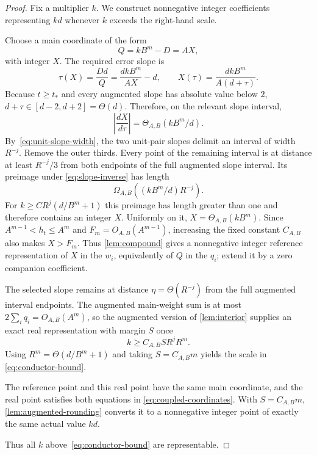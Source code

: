 \begin{proof}
  Fix a multiplier $k$.  We construct nonnegative integer coefficients
  representing $kd$ whenever $k$ exceeds the right-hand scale.

  Choose a main coordinate of the form
  \[
    Q=kB^m-D=AX,
  \]
  with integer $X$.  The required error slope is
  \begin{equation}
    \tau(X)=\frac{Dd}{Q}
           =\frac{dkB^m}{AX}-d,
    \qquad
    X(\tau)=\frac{dkB^m}{A(d+\tau)}.
    \label{eq:slope-inverse}
  \end{equation}
  Because $t\ge t_*$ and every augmented slope has absolute value below $2$,
  $d+\tau\in[d-2,d+2]=\Theta(d)$.  Therefore, on the relevant slope interval,
  \[
    \left|\frac{dX}{d\tau}\right|
    =\Theta_{A,B}(kB^m/d).
  \]
  By~\eqref{eq:unit-slope-width}, the two unit-pair slopes delimit an interval
  of width $R^{-j}$.  Remove the outer thirds.  Every point of the remaining
  interval is at distance at least $R^{-j}/3$ from both endpoints of the full
  augmented slope interval.  Its preimage under
  \eqref{eq:slope-inverse} has length
  \[
    \Omega_{A,B}\!\left((kB^m/d)R^{-j}\right).
  \]
  For $k\ge C R^j(d/B^m+1)$ this preimage has length greater than one and
  therefore contains an integer $X$.  Uniformly on it,
  $X=\Theta_{A,B}(kB^m)$.  Since $A^{m-1}<h_t\le A^m$ and
  $F_m=O_{A,B}(A^{m-1})$, increasing the fixed constant $C_{A,B}$ also makes
  $X>F_m$.  Thus \cref{lem:compound} gives a nonnegative integer reference
  representation of $X$ in the $w_i$, equivalently of $Q$ in the $q_i$;
  extend it by a zero companion coefficient.

  The selected slope remains at distance
  $\eta=\Theta(R^{-j})$ from the full augmented interval endpoints.  The
  augmented main-weight sum is at most $2\sum_iq_i=O_{A,B}(A^m)$, so the
  augmented version of \cref{lem:interior} supplies an exact real
  representation with margin $S$ once
  \[
    k\ge C_{A,B}S R^jR^m.
  \]
  Using $R^m=\Theta(d/B^m+1)$ and taking $S=C_{A,B}m$ yields the scale in
  \eqref{eq:conductor-bound}.

  The reference point and this real point have the same main coordinate, and
  the real point satisfies both equations in
  \eqref{eq:coupled-coordinates}.  With $S=C_{A,B}m$,
  \cref{lem:augmented-rounding} converts it to a nonnegative integer point of
  exactly the same actual value $kd$.

  Thus all $k$ above~\eqref{eq:conductor-bound} are representable.
\end{proof}

